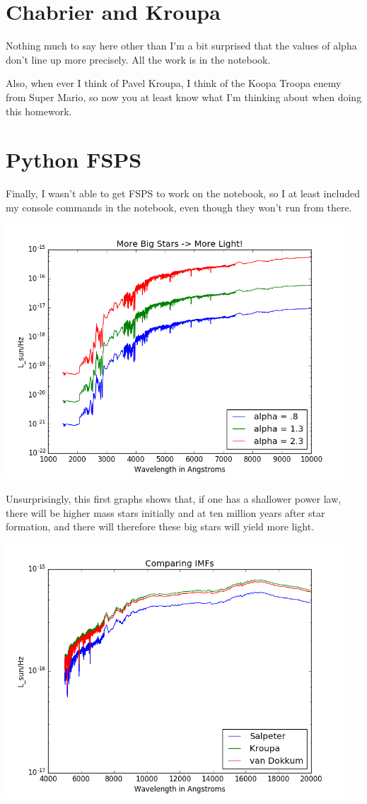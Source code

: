 \documentclass[letterpaper,12pt]{article}
\begin{document}
\section{Chabrier and Kroupa}

Nothing much to say here other than I'm a bit surprised that the values of alpha don't line up more precisely. All the work is in the notebook.

Also, when ever I think of Pavel Kroupa, I think of the Koopa Troopa enemy from Super Mario, so now you at least know what I'm thinking about when doing this homework.

\section{Python FSPS}

Finally, I wasn't able to get FSPS to work on the notebook, so I at least included my console commands in the notebook, even though they won't run from there.

\includegraphics[width = 5in]{threealphas}

Unsurprisingly, this first graphs shows that, if one has a shallower power law, there will be higher mass stars initially and at ten million years after star formation, and there will therefore these big stars will yield more light.

\includegraphics[width = 5in]{ComparingIMFs}
\end{document}
